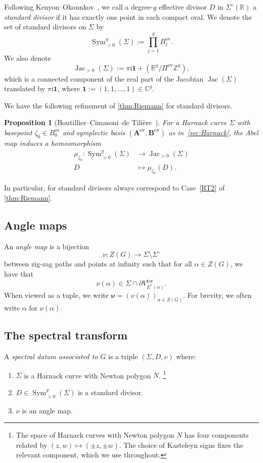 \documentclass[12pt]{amsart}
\makeatletter
\numberwithin{equation}{section}
\newcommand{\itemrefperh@ps}[2]{\textup{#2}}
\newcommand{\itemref}[1]{\begingroup\let\perh@ps\itemrefperh@ps\ref{#1}\endgroup}
\newtheorem{proposition}[theorem]{Proposition}
\theoremstyle{definition}
\newcommand{\Z}{\mathbb{Z}}
\newcommand{\C}{\mathbb{C}}
\newcommand{\R}{\mathbb{R}}
\def\Gtor{G}
\def\divisor{D}
\def\imunit{{\mathrm{i}}}
\def\onebf{\mathbf{1}}
\def\zzG{{{Z}(G)}}
\def\openspectralcurve{{\Sigma^{\circ}}}
\def\sym{\operatorname{Sym}}
\def\jac{{\operatorname{Jac}}}
\def\jacpos{{\operatorname{Jac}_{>0}}}
\def\divisor{D}
\def\Eside{{E^\ast}}
\def\ptSig{\zeta}
\def\basept{{\ptSig_0}}
\def\mcurve{\Sigma}
\makeatother
\begin{document}
Following Kenyon--Okounkov~\cite{KenyonOkounkovHarnack}, we call a degree-$g$ effective divisor $\divisor$ in $\openspectralcurve(\R)$ a \emph{standard divisor} if it has exactly one point in each compact oval. We denote the set of standard divisors on $\mcurve$ by
\[
\sym^g_{>0} (\mcurve) := \prod_{j=1}^g B_j^{\mathrm{ov}}.
\]
We also denote
\[
\jacpos(\mcurve) := \pi \imunit \onebf + (\R^{g} / \Pi^{\mathrm{ov}} \Z^{g}),
\]
which is a connected component of the real part of the Jacobian $\jac(\mcurve)$ translated by $\pi \imunit \onebf$, where $\onebf:=(1,1,\dots,1) \in \C^g$.



We have the following refinement of \cref{thm:Riemann} for standard divisors.

\begin{proposition} [Boutillier--Cimasoni--de Tili\`ere~{\cite[Lemma~15]{BDdT}}] \label{prop:jacpos}
	For a Harnack curve $\mcurve$ with basepoint $\basept \in B_0^{\mathrm{ov}}$ and symplectic basis $(\bm A^{\mathrm{ov}}, \bm B^{\mathrm{ov}})$ as in~\cref{sec:Harnack}, the Abel map induces a homeomorphism \begin{align*}\mu_{\basept}:  \sym^g_{>0} (\mcurve) &\rightarrow \jacpos(\mcurve)\\
	\divisor &\mapsto \mu_\basept(\divisor).
	\end{align*} 
\end{proposition}
In particular, for standard divisors always correspond to Case~\itemref{RT2} of \cref{thm:Riemann}.

\subsection{Angle maps}

 An \emph{angle map} is a bijection 
\[
\nu:\zzG \to \mcurve \setminus \openspectralcurve
\]
between zig-zag paths and points at infinity such that for all $\alpha \in \zzG$, we have that \[\nu(\alpha) \in \mcurve \cap \partial V^{\mathrm{tor}}_{\Eside(\alpha)}.\] When viewed as a tuple, we write 
$
\bm \nu = (\nu(\alpha))_{\alpha \in \zzG}.
$ For brevity, we often write $\alpha$ for $\nu(\alpha)$. 



\subsection{The spectral transform}

A \emph{spectral datum associated to $\Gtor$} is a triple $(\mcurve,\divisor,\nu)$ where:
\begin{enumerate}
  \item $\mcurve$ is a Harnack curve with Newton polygon $N$. \footnote{The space of Harnack curves with Newton polygon $N$ has four
components related by $(z,w)\mapsto(\pm z,\pm w)$. The choice of
Kasteleyn signs fixes the relevant component, which we use throughout.}
  \item $\divisor \in \sym^g_{>0} (\mcurve)$ is a standard divisor.
  \item $\nu$ is an angle map.
\end{enumerate}
\end{document}
